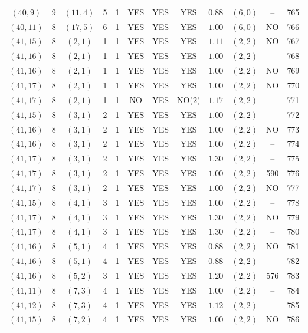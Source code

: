 \begin{longtable}{|c|c|c|c|c|c|c|c|c|c|c|c|}
$(40,9)$ & 9 & $(11,4)$ & 5 & 1 & YES & YES & YES & $0.88$ & $(6,0)$ & -- & 765\\
$(40,11)$ & 8 & $(17,5)$ & 6 & 1 & YES & YES & YES & $1.00$ & $(6,0)$ & NO & 766\\
$(41,15)$ & 8 & $(2,1)$ & 1 & 1 & YES & YES & YES & $1.11$ & $(2,2)$ & NO & 767\\
$(41,16)$ & 8 & $(2,1)$ & 1 & 1 & YES & YES & YES & $1.00$ & $(2,2)$ & -- & 768\\
$(41,16)$ & 8 & $(2,1)$ & 1 & 1 & YES & YES & YES & $1.00$ & $(2,2)$ & NO & 769\\
$(41,17)$ & 8 & $(2,1)$ & 1 & 1 & YES & YES & YES & $1.00$ & $(2,2)$ & NO & 770\\
$(41,17)$ & 8 & $(2,1)$ & 1 & 1 & NO & YES & NO(2) & $1.17$ & $(2,2)$ & -- & 771\\
$(41,15)$ & 8 & $(3,1)$ & 2 & 1 & YES & YES & YES & $1.00$ & $(2,2)$ & -- & 772\\
$(41,16)$ & 8 & $(3,1)$ & 2 & 1 & YES & YES & YES & $1.00$ & $(2,2)$ & NO & 773\\
$(41,16)$ & 8 & $(3,1)$ & 2 & 1 & YES & YES & YES & $1.00$ & $(2,2)$ & -- & 774\\
$(41,17)$ & 8 & $(3,1)$ & 2 & 1 & YES & YES & YES & $1.30$ & $(2,2)$ & -- & 775\\
$(41,17)$ & 8 & $(3,1)$ & 2 & 1 & YES & YES & YES & $1.00$ & $(2,2)$ & 590 & 776\\
$(41,17)$ & 8 & $(3,1)$ & 2 & 1 & YES & YES & YES & $1.00$ & $(2,2)$ & NO & 777\\
$(41,15)$ & 8 & $(4,1)$ & 3 & 1 & YES & YES & YES & $1.00$ & $(2,2)$ & -- & 778\\
$(41,17)$ & 8 & $(4,1)$ & 3 & 1 & YES & YES & YES & $1.30$ & $(2,2)$ & NO & 779\\
$(41,17)$ & 8 & $(4,1)$ & 3 & 1 & YES & YES & YES & $1.30$ & $(2,2)$ & -- & 780\\
$(41,16)$ & 8 & $(5,1)$ & 4 & 1 & YES & YES & YES & $0.88$ & $(2,2)$ & NO & 781\\
$(41,16)$ & 8 & $(5,1)$ & 4 & 1 & YES & YES & YES & $0.88$ & $(2,2)$ & -- & 782\\
$(41,16)$ & 8 & $(5,2)$ & 3 & 1 & YES & YES & YES & $1.20$ & $(2,2)$ & 576 & 783\\
$(41,11)$ & 8 & $(7,3)$ & 4 & 1 & YES & YES & YES & $1.00$ & $(2,2)$ & -- & 784\\
$(41,12)$ & 8 & $(7,3)$ & 4 & 1 & YES & YES & YES & $1.12$ & $(2,2)$ & -- & 785\\
$(41,15)$ & 8 & $(7,2)$ & 4 & 1 & YES & YES & YES & $1.00$ & $(2,2)$ & NO & 786\\

\end{longtable}
